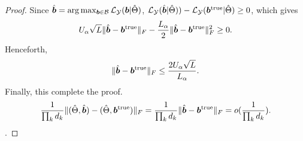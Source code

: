 \documentclass[11pt]{article}
\theoremstyle{plain}
\theoremstyle{definition}
\begin{document}
\begin{proof}
Since $\hat {\bm{b}}=\arg\max_{\bm{b}\in\mathcal{B}}\mathcal{L}_{\mathcal{Y}}(\bm{b}|\hat\Theta)$, $\mathcal{L}_{\mathcal{Y}}(\hat{\bm{b}}|\hat\Theta))-\mathcal{L}_{\mathcal{Y}}(\bm{b}^{\text{true}}|\hat\Theta)\geq 0$, which gives
\[
U_\alpha\sqrt{L}\lVert\hat{\bm{b}}-\bm{b}^{\text{true}}\rVert_F -\frac{L_\alpha}{2} \lVert\hat{\bm{b}}-\bm{b}^{\text{true}}\rVert_F^2\geq 0.
\]
Henceforth,
\[
\lVert\hat{\bm{b}}-\bm{b}^{\text{true}}\rVert_F\leq \frac{2U_\alpha \sqrt{L}}{L_\alpha}.
\]
Finally, this complete the proof.
\begin{equation}
  \frac{1}{\prod_k d_k}\lVert(\hat\Theta,\hat{\bm{b}})-(\hat\Theta,\bm{b}^{\text{true}})\rVert_F =\frac{1}{\prod_k d_k}\lVert\hat{\bm{b}}-\bm{b}^{\text{true}}\rVert_F
  = o(\frac{1}{\prod_k d_k}).
\end{equation}.


\end{proof}



\end{document}

